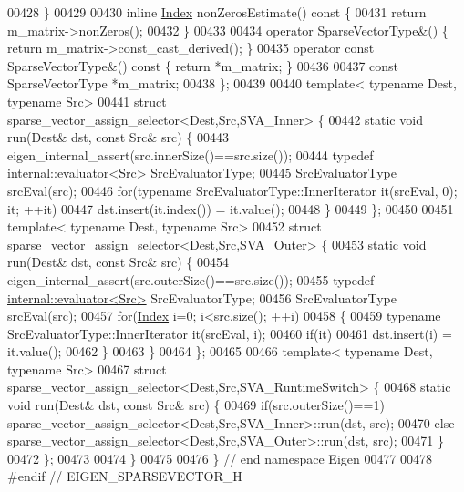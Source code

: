 \begin{DoxyCode}
00428   \}
00429   
00430   \textcolor{keyword}{inline} \hyperlink{group___core___module_a554f30542cc2316add4b1ea0a492ff02}{Index} nonZerosEstimate()\textcolor{keyword}{ const }\{
00431     \textcolor{keywordflow}{return} m\_matrix->nonZeros();
00432   \}
00433   
00434   \textcolor{keyword}{operator} SparseVectorType&() \{ \textcolor{keywordflow}{return} m\_matrix->const\_cast\_derived(); \}
00435   \textcolor{keyword}{operator} \textcolor{keyword}{const} SparseVectorType&() \textcolor{keyword}{const} \{ \textcolor{keywordflow}{return} *m\_matrix; \}
00436   
00437   \textcolor{keyword}{const} SparseVectorType *m\_matrix;
00438 \};
00439 
00440 \textcolor{keyword}{template}< \textcolor{keyword}{typename} Dest, \textcolor{keyword}{typename} Src>
00441 \textcolor{keyword}{struct }sparse\_vector\_assign\_selector<Dest,Src,SVA\_Inner> \{
00442   \textcolor{keyword}{static} \textcolor{keywordtype}{void} run(Dest& dst, \textcolor{keyword}{const} Src& src) \{
00443     eigen\_internal\_assert(src.innerSize()==src.size());
00444     \textcolor{keyword}{typedef} \hyperlink{struct_eigen_1_1internal_1_1evaluator}{internal::evaluator<Src>} SrcEvaluatorType;
00445     SrcEvaluatorType srcEval(src);
00446     \textcolor{keywordflow}{for}(\textcolor{keyword}{typename} SrcEvaluatorType::InnerIterator it(srcEval, 0); it; ++it)
00447       dst.insert(it.index()) = it.value();
00448   \}
00449 \};
00450 
00451 \textcolor{keyword}{template}< \textcolor{keyword}{typename} Dest, \textcolor{keyword}{typename} Src>
00452 \textcolor{keyword}{struct }sparse\_vector\_assign\_selector<Dest,Src,SVA\_Outer> \{
00453   \textcolor{keyword}{static} \textcolor{keywordtype}{void} run(Dest& dst, \textcolor{keyword}{const} Src& src) \{
00454     eigen\_internal\_assert(src.outerSize()==src.size());
00455     \textcolor{keyword}{typedef} \hyperlink{struct_eigen_1_1internal_1_1evaluator}{internal::evaluator<Src>} SrcEvaluatorType;
00456     SrcEvaluatorType srcEval(src);
00457     \textcolor{keywordflow}{for}(\hyperlink{group___core___module_a554f30542cc2316add4b1ea0a492ff02}{Index} i=0; i<src.size(); ++i)
00458     \{
00459       \textcolor{keyword}{typename} SrcEvaluatorType::InnerIterator it(srcEval, i);
00460       \textcolor{keywordflow}{if}(it)
00461         dst.insert(i) = it.value();
00462     \}
00463   \}
00464 \};
00465 
00466 \textcolor{keyword}{template}< \textcolor{keyword}{typename} Dest, \textcolor{keyword}{typename} Src>
00467 \textcolor{keyword}{struct }sparse\_vector\_assign\_selector<Dest,Src,SVA\_RuntimeSwitch> \{
00468   \textcolor{keyword}{static} \textcolor{keywordtype}{void} run(Dest& dst, \textcolor{keyword}{const} Src& src) \{
00469     \textcolor{keywordflow}{if}(src.outerSize()==1)  sparse\_vector\_assign\_selector<Dest,Src,SVA\_Inner>::run(dst, src);
00470     \textcolor{keywordflow}{else}                    sparse\_vector\_assign\_selector<Dest,Src,SVA\_Outer>::run(dst, src);
00471   \}
00472 \};
00473 
00474 \}
00475 
00476 \} \textcolor{comment}{// end namespace Eigen}
00477 
00478 \textcolor{preprocessor}{#endif // EIGEN\_SPARSEVECTOR\_H}
\end{DoxyCode}
